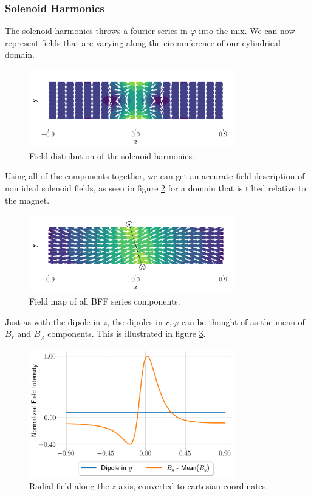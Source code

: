\subsubsection{Solenoid Harmonics}
The solenoid harmonics throws a fourier series in
$\varphi$ into the mix. We can now represent fields that 
are varying along the circumference of our cylindrical domain.

\begin{figure}[!h]
    \centering
    \includegraphics[width=0.8\textwidth]{figs/solharm.png}
    \caption{Field distribution of the solenoid harmonics.}
    \label{fig:solharm}
\end{figure}

Using all of the components together, we can get an accurate
field description of non ideal solenoid fields, as seen in figure
\ref{fig:allharmonics} for a domain that is tilted relative to the 
magnet.

\begin{figure}[!h]
    \centering
    \includegraphics[width=0.8\textwidth]{figs/allcomponents.png}
    \caption{Field map of all BFF series components.}
    \label{fig:allharmonics}
\end{figure}

Just as with the dipole in $z$, the dipoles in $r,\varphi$
can be thought of as the mean of $B_r$ and $B_\varphi$
components.
This is illustrated in figure \ref{fig:radialplot}.

\begin{figure}[!h]
    \centering
    \includegraphics[width=0.8\textwidth]{figs/radialplot.png}
    \caption{Radial field along the $z$ axis, converted
    to cartesian coordinates.}
    \label{fig:radialplot}
\end{figure}

